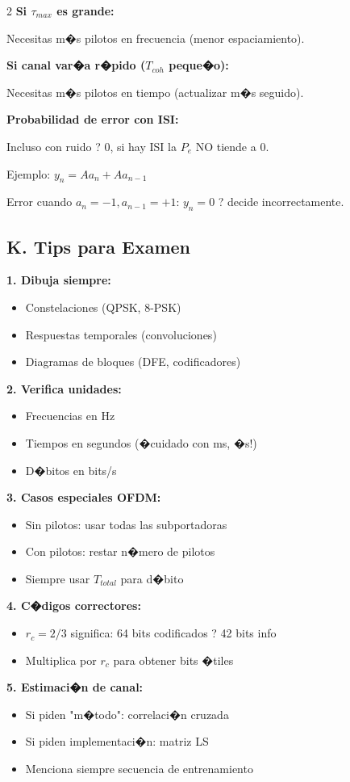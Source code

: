 ﻿\documentclass[8pt,a4paper]{article}
\begin{document}
\begin{multicols}{2}
\textbf{Si $\tau_{max}$ es grande:}

Necesitas m�s pilotos en frecuencia (menor espaciamiento).

\textbf{Si canal var�a r�pido ($T_{coh}$ peque�o):}

Necesitas m�s pilotos en tiempo (actualizar m�s seguido).

\textbf{Probabilidad de error con ISI:}

Incluso con ruido ? 0, si hay ISI la $P_e$ NO tiende a 0.

Ejemplo: $y_n = Aa_n + Aa_{n-1}$

Error cuando $a_n = -1, a_{n-1} = +1$: $y_n = 0$ ? decide incorrectamente.

\vspace{-2mm}
\subsection*{\small K. Tips para Examen}
\vspace{-2mm}

\textbf{1. Dibuja siempre:}
\begin{itemize}[leftmargin=*,itemsep=1pt]
    \item Constelaciones (QPSK, 8-PSK)
    \item Respuestas temporales (convoluciones)
    \item Diagramas de bloques (DFE, codificadores)
\end{itemize}

\textbf{2. Verifica unidades:}
\begin{itemize}[leftmargin=*,itemsep=1pt]
    \item Frecuencias en Hz
    \item Tiempos en segundos (�cuidado con ms, �s!)
    \item D�bitos en bits/s
\end{itemize}

\textbf{3. Casos especiales OFDM:}
\begin{itemize}[leftmargin=*,itemsep=1pt]
    \item Sin pilotos: usar todas las subportadoras
    \item Con pilotos: restar n�mero de pilotos
    \item Siempre usar $T_{total}$ para d�bito
\end{itemize}

\textbf{4. C�digos correctores:}
\begin{itemize}[leftmargin=*,itemsep=1pt]
    \item $r_c = 2/3$ significa: 64 bits codificados ? 42 bits info
    \item Multiplica por $r_c$ para obtener bits �tiles
\end{itemize}

\textbf{5. Estimaci�n de canal:}
\begin{itemize}[leftmargin=*,itemsep=1pt]
    \item Si piden "m�todo": correlaci�n cruzada
    \item Si piden implementaci�n: matriz LS
    \item Menciona siempre secuencia de entrenamiento
\end{itemize}

\end{multicols}
\end{document}
